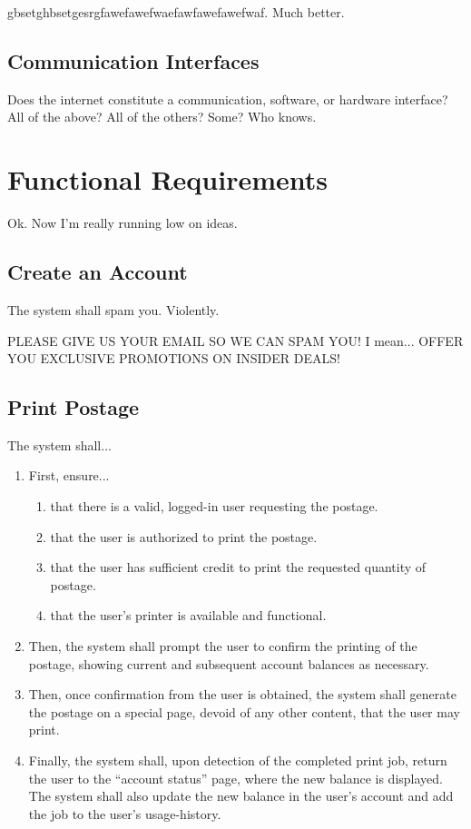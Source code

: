 \documentclass{scrreprt}
\begin{document}
gbsetghbsetgesrgfawefawefwaefawfawefawefwaf. Much better.

\subsection{Communication Interfaces}

Does the internet constitute a communication, software, or hardware 
interface? All of the above? All of the others? Some? Who knows.

\section{Functional Requirements}

Ok. Now I'm really running low on ideas.

\subsection{Create an Account}

The system shall spam you. Violently.

PLEASE GIVE US YOUR EMAIL SO WE CAN SPAM YOU! I mean... 
OFFER YOU EXCLUSIVE PROMOTIONS ON INSIDER DEALS!

\subsection{Print Postage}

The system shall...

\begin{enumerate}
\item First, ensure...
\begin{enumerate}
\item that there is a valid, logged-in user requesting the postage.
\item that the user is authorized to print the postage.
\item that the user has sufficient credit to print the requested quantity of 
postage.
\item that the user's printer is available and functional.
\end{enumerate}
\item Then, the system shall prompt the user to confirm the printing of the 
postage, showing current and subsequent account balances as necessary.
\item Then, once confirmation from the user is obtained, the system shall 
generate the postage on a special page, devoid of any other content, that the 
user may print.
\item Finally, the system shall, upon detection of the completed print job, 
return the user to the ``account status'' page, where the new balance is 
displayed. The system shall also update the new balance in the user's account 
and add the job to the user's usage-history.
\end{enumerate}
\end{document}
